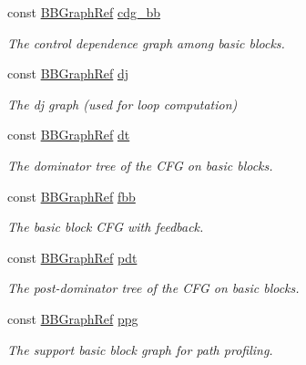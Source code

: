 \begin{DoxyCompactItemize}
const \hyperlink{basic__block_8hpp_a0e7f233d1b83cad0bfd5aa865f0d3532}{B\+B\+Graph\+Ref} \hyperlink{classFunctionBehavior_aea765c5e4164aabb2de06f124b094308}{cdg\+\_\+bb}
\begin{DoxyCompactList}\small\item\em The control dependence graph among basic blocks. \end{DoxyCompactList}\item 
const \hyperlink{basic__block_8hpp_a0e7f233d1b83cad0bfd5aa865f0d3532}{B\+B\+Graph\+Ref} \hyperlink{classFunctionBehavior_a09bdaf73e8044e57b73d2e8f406f3bdb}{dj}
\begin{DoxyCompactList}\small\item\em The dj graph (used for loop computation) \end{DoxyCompactList}\item 
const \hyperlink{basic__block_8hpp_a0e7f233d1b83cad0bfd5aa865f0d3532}{B\+B\+Graph\+Ref} \hyperlink{classFunctionBehavior_a9dafaa93a5ba25374a0362329347b43a}{dt}
\begin{DoxyCompactList}\small\item\em The dominator tree of the C\+FG on basic blocks. \end{DoxyCompactList}\item 
const \hyperlink{basic__block_8hpp_a0e7f233d1b83cad0bfd5aa865f0d3532}{B\+B\+Graph\+Ref} \hyperlink{classFunctionBehavior_aeed6d388455b5859bd4d84ff7a8f60e5}{fbb}
\begin{DoxyCompactList}\small\item\em The basic block C\+FG with feedback. \end{DoxyCompactList}\item 
const \hyperlink{basic__block_8hpp_a0e7f233d1b83cad0bfd5aa865f0d3532}{B\+B\+Graph\+Ref} \hyperlink{classFunctionBehavior_a8fd7d69eac3336a63a3b923cc79d9823}{pdt}
\begin{DoxyCompactList}\small\item\em The post-\/dominator tree of the C\+FG on basic blocks. \end{DoxyCompactList}\item 
const \hyperlink{basic__block_8hpp_a0e7f233d1b83cad0bfd5aa865f0d3532}{B\+B\+Graph\+Ref} \hyperlink{classFunctionBehavior_a8dc371d0ec08c289ed8c6d5b5e95a13a}{ppg}
\begin{DoxyCompactList}\small\item\em The support basic block graph for path profiling. \end{DoxyCompactList}\item 

\end{DoxyCompactItemize}
